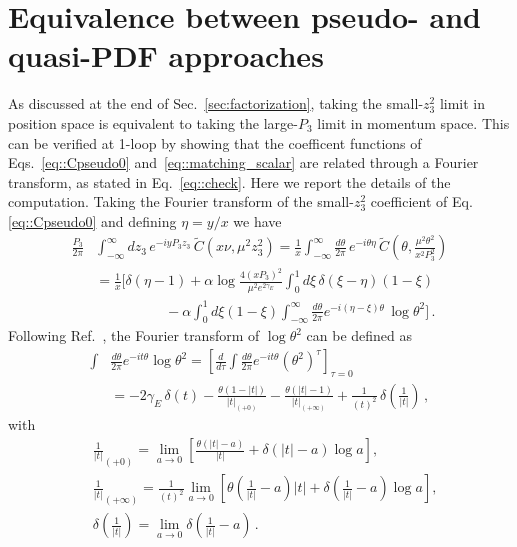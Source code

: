 \section{Equivalence between pseudo- and quasi-PDF approaches}
\label{app:check}

As discussed at the end of Sec.~\ref{sec:factorization}, taking the
small-$z_3^2$ limit in position space is equivalent to taking the large-$P_3$
limit in momentum space. This can be verified at 1-loop by showing that the
coefficent functions of Eqs.~\eqref{eq::Cpseudo0} and~\eqref{eq::matching_scalar} are
related through a Fourier transform, as stated in Eq.~\eqref{eq::check}. Here we
report the details of the computation. Taking the Fourier transform of the
small-$z_3^2$ coefficient of Eq.\eqref{eq::Cpseudo0} and defining $\eta= y/x$ we
have 
\begin{align}
    \label{eq::checkapp}
	\frac{P_3}{2\pi}&\int_{-\infty}^{\infty} dz_3\, e^{-i y P_3 z_3 }\,
	\tilde{C}\left(x\nu, \mu^2 z_3^2 \right) = 
    \frac{1}{x}\int_{-\infty}^{\infty}\frac{d\theta}{2\pi}\, e^{-i\theta\eta}\,
	\tilde{C}\left(\theta, \frac{\mu^2\theta^2}{x^2 P_3^2} \right) \nonumber \\
    & = \frac{1}{x}\biggl[\delta\left(\eta-1\right) 
    +\alpha\log\frac{4 \left(xP_3\right)^2}{\mu^2 e^{2\gamma_E}}\int_0^1 d\xi\,
    \delta\left(\xi-\eta\right)\left(1-\xi\right) \nonumber \\
    &\,\,\,\,\,\,\,\,\,\,\,\,\,\,\,\,\,\,\,\,\,\,\,\,\,\,\,\,\,\,
    -\alpha\int_0^1 d\xi \left(1-\xi\right)\int_{-\infty}^{\infty} \frac{d\theta}{2\pi} 
    e^{-i \left(\eta-\xi\right) \theta} \,\log\theta^2\biggr]\, .
\end{align}
Following Ref.~\cite{Izubuchi:2018srq}, the Fourier transform of $\log\theta^2$
can be defined as
\begin{align}
    \label{eq::FTlog}
    \int& \frac{d\theta}{2\pi} e^{-i t \theta} \log \theta^2
    = \left[\frac{d}{d\tau} \int \frac{d\theta}{2\pi} e^{-it \theta} 
    \left(\theta^2\right)^{\tau}\right]_{\tau=0} \nonumber\\
    &= -2 \gamma_E \, \delta\left(t\right) - \frac{\theta\left(1 - |t|\right)}{|t|_{\left(+0\right)}}
    - \frac{\theta\left(|t| -1\right)}{|t|_{\left(+\infty\right)}}
    + \frac{1}{\left(t\right)^2}\,\delta\left(\frac{1}{|t|}\right)\, ,
\end{align}
with
\begin{align}
    \label{eq::distribution1}
    &\frac{1}{|t|}_{\left(+0\right)} 
    = \lim_{a\rightarrow 0}
    \left[\frac{\theta\left(|t|-a\right)}{|t|} +  \delta\left(|t|-a\right)\log a\right], \\
    &\frac{1}{|t|}_{\left(+\infty\right)} 
    = \frac{1}{\left(t\right)^2}\lim_{a\rightarrow 0}
    \left[\theta\left(\frac{1}{|t|}-a\right)|t| + \delta\left(\frac{1}{|t|}-a\right)\log a\right], \\
    &\delta\left(\frac{1}{|t|}\right) = \lim_{a\rightarrow 0}\delta\left(\frac{1}{|t|} - a\right)\, .
\end{align}
